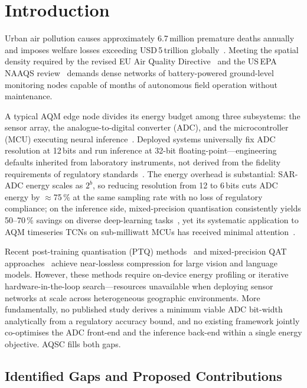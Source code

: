 \documentclass[12pt,a4paper]{article}
\begin{document}

\section{Introduction}
\label{sec:intro}

Urban air pollution causes approximately 6.7\,million premature deaths
annually and imposes welfare losses exceeding USD\,5\,trillion
globally~\cite{who2021}.
Meeting the spatial density required by the revised EU Air Quality
Directive~\cite{euaqd2023} and the US\,EPA NAAQS review~\cite{epa2024}
demands dense networks of battery-powered ground-level monitoring nodes
capable of months of autonomous field operation without maintenance.

A typical AQM edge node divides its energy budget among three
subsystems: the sensor array, the analogue-to-digital converter (ADC),
and the microcontroller (MCU) executing neural inference~\cite{chen2023tinyml}.
Deployed systems universally fix ADC resolution at 12\,bits and run
inference at 32-bit floating-point---engineering defaults inherited
from laboratory instruments, not derived from the fidelity requirements
of regulatory standards~\cite{ma2023aqedge}.
The energy overhead is substantial: SAR-ADC energy scales as $2^b$,
so reducing resolution from 12 to 6\,bits cuts ADC energy by
$\approx$75\,\% at the same sampling rate with no loss of regulatory
compliance; on the inference side, mixed-precision quantisation
consistently yields 50--70\,\% savings on diverse deep-learning
tasks~\cite{menghani2023edl,nagel2021whitepaper}, yet its systematic
application to AQM timeseries TCNs on sub-milliwatt MCUs has received
minimal attention~\cite{banbury2021mlperf}.

Recent post-training quantisation (PTQ) methods~\cite{frantar2023gptq,li2021brecq}
and mixed-precision QAT approaches~\cite{xiao2023smoothquant,dettmers2023qlora}
achieve near-lossless compression for large vision and language models.
However, these methods require on-device energy profiling or
iterative hardware-in-the-loop search---resources unavailable when
deploying sensor networks at scale across heterogeneous geographic
environments.
More fundamentally, no published study derives a minimum viable ADC
bit-width analytically from a regulatory accuracy bound, and no
existing framework jointly co-optimises the ADC front-end and the
inference back-end within a single energy objective.
AQSC fills both gaps.

\subsection{Identified Gaps and Proposed Contributions}
\label{sec:gap_contrib}
\end{document}
